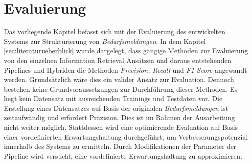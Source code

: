 \chapter{Evaluierung}
\label{chap:evaluation}
Das vorliegende Kapitel befasst sich mit der Evaluierung des entwickelten Systems zur Strukturierung von \emph{Bedarfsmeldungen}. In dem Kapitel \ref{sec:literaturueberblick} wurde dargelegt, dass gängige Methoden zur Evaluierung von den einzelnen Information Retrieval Ansätzen und daraus entstehenden Pipelines und Hybriden die Methoden \emph{Precision, Recall} und \emph{F1-Score} angewandt werden. Grundsätzlich wäre dies ein valider Ansatz zur Evaluation. Dennoch bestehen keine Grundvoraussetzungen zur Durchführung dieser Methoden. Es liegt kein Datensatz mit ausreichenden Trainings und Testdaten vor. Die Erstellung eines Datensatzes auf Basis der originalen \emph{Bedarfsmeldungen} ist zeitaufwändig und erfordert Präzision. Dies ist im Rahmen der Ausarbeitung nicht weiter möglich. Stattdessen wird eine optimierende Evaluation auf Basis einer vordefinierten Erwartungshaltung durchgeführt, um Verbesserungspotenzial innerhalb des Systems zu ermitteln. Durch Modifikationen der Parameter der Pipeline wird versucht, eine vordefinierte Erwartungshaltung zu approximieren. 






